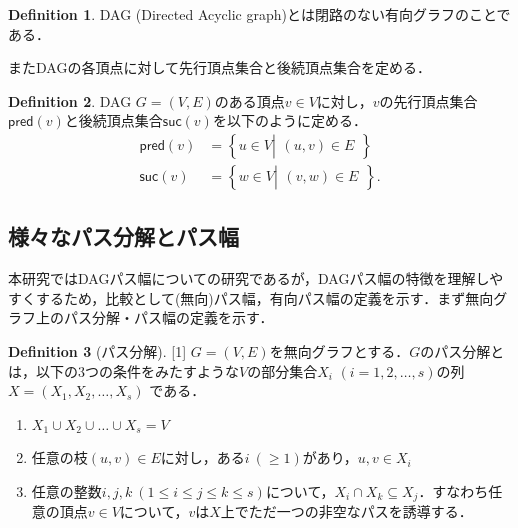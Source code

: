 \documentclass[master]{kuisthesis}		%
\theoremstyle{plain}
\theoremstyle{definition}
\newtheorem{definition*}{Definition}
\begin{document}
\begin{definition*}
    DAG (Directed Acyclic graph)とは閉路のない有向グラフのことである．
\end{definition*}

またDAGの各頂点に対して先行頂点集合と後続頂点集合を定める．


\begin{definition*}
    DAG $G=(V, E)$のある頂点$v \in V$に対し，$v$の先行頂点集合$\mathsf{pred}(v)$と後続頂点集合$\mathsf{suc}(v)$を以下のように定める．
    \begin{align*}
        \mathsf{pred}(v) &= \left\{ u \in V \left |
        \begin{array}{l}
            \text{$(u, v) \in E$}
        \end{array}
        \right. \right\}\\
        \mathsf{suc}(v) &= \left\{ w \in V \left |
        \begin{array}{l}
            \text{$(v, w) \in E$}
        \end{array}
        \right. \right\}.
    \end{align*}
    
\end{definition*}




\subsection{様々なパス分解とパス幅} %
本研究ではDAGパス幅についての研究であるが，DAGパス幅の特徴を理解しやすくするため，比較として(無向)パス幅，有向パス幅の定義を示す．まず無向グラフ上のパス分解・パス幅の定義を示す．

\begin{definition*}[パス分解][1]
    $G=(V, E)$を無向グラフとする．$G$のパス分解とは，以下の3つの条件をみたすような$V$の部分集合$X_i$ $(i = 1, 2,  \dots, s)$の列 $X=(X_1, X_2,  \dots, X_s)$ である．
    
    \begin{enumerate}
        \item $ X_1 \cup X_2 \cup \dots \cup X_s = V $ 
        \item 任意の枝$(u, v) \in E $に対し，ある$i\ (\geq 1)$があり，$u, v \in X_i$
        \item 任意の整数$ i, j, k\ (1 \leq i \leq j \leq k \leq s)$について，$X_i \cap X_k \subseteq X_j$．すなわち任意の頂点$v \in V$について，$v$は$X$上でただ一つの非空なパスを誘導する．
    \end{enumerate}
\end{definition*}
\end{document}
